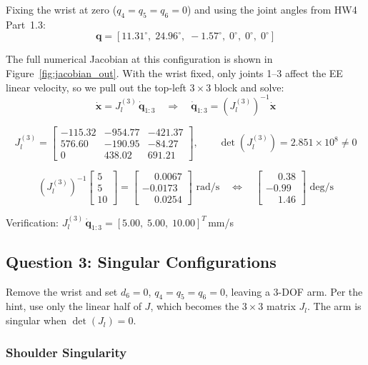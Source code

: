 \documentclass[12pt]{article}
\begin{document}
Fixing the wrist at zero ($q_4=q_5=q_6=0$) and using the joint
angles from HW4 Part~1.3:
\[
\mathbf{q} = [11.31^\circ,\;24.96^\circ,\;-1.57^\circ,\;0^\circ,\;0^\circ,\;0^\circ]
\]

The full numerical Jacobian at this configuration is shown in Figure~\ref{fig:jacobian_out}.
With the wrist fixed, only joints 1--3 affect the EE linear velocity,
so we pull out the top-left $3\times3$ block and solve:
\[
\dot{\mathbf{x}} = J_l^{(3)}\,\dot{\mathbf{q}}_{1:3}
\quad\Rightarrow\quad
\dot{\mathbf{q}}_{1:3} = \left(J_l^{(3)}\right)^{-1}\dot{\mathbf{x}}
\]

\[
J_l^{(3)} =
\begin{bmatrix}
-115.32 & -954.77 & -421.37 \\
 576.60 & -190.95 &  -84.27 \\
    0   &  438.02 &  691.21
\end{bmatrix}, \qquad
\det\!\left(J_l^{(3)}\right) = 2.851\times10^8 \neq 0
\]

\[
\left(J_l^{(3)}\right)^{-1}
  \begin{bmatrix}5\\5\\10\end{bmatrix}
=
\begin{bmatrix}
\phantom{-}0.0067 \\
-0.0173 \\
\phantom{-}0.0254
\end{bmatrix}
\text{ rad/s}
\quad\Leftrightarrow\quad
\begin{bmatrix}
\phantom{-}0.38 \\
-0.99 \\
\phantom{-}1.46
\end{bmatrix}
\text{ deg/s}
\]

Verification: $J_l^{(3)}\,\dot{\mathbf{q}}_{1:3} = [5.00,\;5.00,\;10.00]^T$\,mm/s\;\checkmark

\subsection{Question 3: Singular Configurations}

Remove the wrist and set $d_6=0$, $q_4=q_5=q_6=0$, leaving a
3-DOF arm. Per the hint, use only the linear half of $J$, which
becomes the $3\times3$ matrix $J_l$. The arm is singular when
$\det(J_l) = 0$.

\subsubsection*{Shoulder Singularity}
\end{document}
